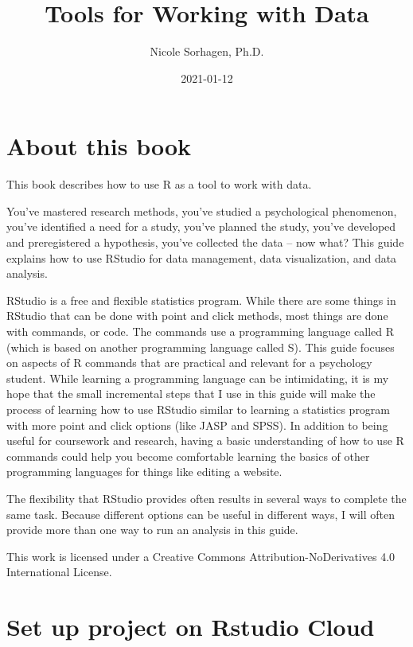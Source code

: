 \documentclass[
]{book}
\title{Tools for Working with Data}
\author{Nicole Sorhagen, Ph.D.}
\date{2021-01-12}
\begin{document}
\maketitle

{
\setcounter{tocdepth}{1}
\tableofcontents
}
\hypertarget{about-this-book}{%
\chapter{About this book}\label{about-this-book}}

This book describes how to use R as a tool to work with data.

You've mastered research methods, you've studied a psychological phenomenon, you've identified a need for a study, you've planned the study, you've developed and preregistered a hypothesis, you've collected the data -- now what? This guide explains how to use RStudio for data management, data visualization, and data analysis.

RStudio is a free and flexible statistics program. While there are some things in RStudio that can be done with point and click methods, most things are done with commands, or code. The commands use a programming language called R (which is based on another programming language called S). This guide focuses on aspects of R commands that are practical and relevant for a psychology student. While learning a programming language can be intimidating, it is my hope that the small incremental steps that I use in this guide will make the process of learning how to use RStudio similar to learning a statistics program with more point and click options (like JASP and SPSS). In addition to being useful for coursework and research, having a basic understanding of how to use R commands could help you become comfortable learning the basics of other programming languages for things like editing a website.

The flexibility that RStudio provides often results in several ways to complete the same task. Because different options can be useful in different ways, I will often provide more than one way to run an analysis in this guide.

This work is licensed under a Creative Commons Attribution-NoDerivatives 4.0 International License.

\hypertarget{set-up-project-on-rstudio-cloud}{%
\chapter{Set up project on Rstudio Cloud}\label{set-up-project-on-rstudio-cloud}}
\end{document}
